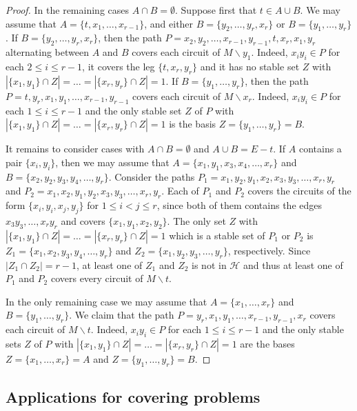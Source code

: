 \documentclass[11pt,a4paper]{article}
\theoremstyle{plain}
\theoremstyle{definition}
\newcommand{\cH}{\mathcal{H}}
\begin{document}
\begin{proof}
In the remaining cases $A \cap B = \emptyset$. Suppose first that $t \in A \cup B$. We may assume that $A = \{t,x_1,\dots,x_{r-1}\}$, and either $B=\{y_2,\dots,y_r, x_r\}$ or $B=\{y_1,\dots,y_r\}$. If $B=\{y_2,\dots, y_r,x_r\}$, then the path $P=x_2,y_2,\dots, x_{r-1}, y_{r-1}, t, x_r, x_1, y_r$ alternating between $A$ and $B$ covers each circuit of $M\backslash y_1$. Indeed, $x_iy_i \in P$ for each $2\le i \le r-1$, it covers the leg $\{t,x_r,y_r\}$ and it has no stable set $Z$ with $|\{x_1,y_1\} \cap Z| = \dots = |\{x_r,y_r\} \cap Z| = 1$. If $B=\{y_1,\dots, y_r\}$, then the path $P=t,y_r,x_1,y_1,\dots, x_{r-1},y_{r-1}$ covers each circuit of $M \backslash x_r$. Indeed, $x_iy_i \in P$ for each $1 \le i \le r-1$ and the only stable set $Z$ of $P$ with $|\{x_1,y_1\}\cap Z| = \dots = |\{x_r,y_r\}\cap Z| = 1$ is the basis $Z=\{y_1,\dots, y_r\} = B$.

It remains to consider cases with $A \cap B = \emptyset$ and $A \cup B = E-t$. If $A$ contains a pair $\{x_i,y_i\}$, then we may assume that $A=\{x_1,y_1,x_3,x_4,\dots, x_r\}$ and $B=\{x_2,y_2,y_3,y_4,\dots,y_r\}$. Consider the paths $P_1 = x_1,y_2,y_1,x_2,x_3,y_3,\dots,x_r,y_r$ and $P_2 = x_1,x_2,y_1,y_2,x_3,y_3,\dots, x_r,y_r$. Each of $P_1$ and $P_2$ covers the circuits of the form $\{x_i,y_i,x_j,y_j\}$ for $1 \le i < j \le r$, since both of them contains the edges $x_3y_3, \dots, x_ry_r$ and covers $\{x_1,y_1,x_2,y_2\}$. The only set $Z$ with $|\{x_1,y_1\} \cap Z| = \dots = |\{x_r,y_r\} \cap Z| = 1$ which is a stable set of $P_1$ or $P_2$ is $Z_1 = \{x_1,x_2,y_3,y_4,\dots, y_r\}$ and $Z_2 = \{x_1,y_2,y_3,\dots, y_r\}$, respectively. Since $|Z_1 \cap Z_2| = r-1$, at least one of $Z_1$ and $Z_2$ is not in $\cH$ and thus at least one of $P_1$ and $P_2$ covers every circuit of $M\backslash t$.

In the only remaining case we may assume that $A=\{x_1,\dots, x_r\}$ and $B=\{y_1,\dots, y_r\}$. We claim that the path $P=y_r,x_1,y_1,\dots,x_{r-1},y_{r-1},x_r$ covers each circuit of $M\backslash t$. Indeed, $x_iy_i \in P$ for each $1 \le i \le r-1$ and the only stable sets $Z$ of $P$ with $|\{x_1,y_1\}\cap Z| = \dots = |\{x_r,y_r\}\cap Z| = 1$ are the bases $Z=\{x_1,\dots, x_r\} = A$ and $Z=\{y_1,\dots, y_r\} = B$.
\end{proof}

\subsection{Applications for covering problems}
\label{sec:cor}
\end{document}

